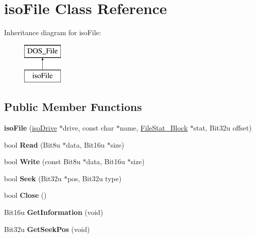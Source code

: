 \hypertarget{classisoFile}{\section{iso\-File Class Reference}
\label{classisoFile}
}
Inheritance diagram for iso\-File\-:\begin{figure}[H]
\begin{center}
\leavevmode
\includegraphics[height=2.000000cm]{classisoFile}
\end{center}
\end{figure}
\subsection*{Public Member Functions}
\begin{DoxyCompactItemize}
\item 
\hypertarget{classisoFile_a67bf2750ca70939ed41e6ecb53c5f355}{{\bfseries iso\-File} (\hyperlink{classisoDrive}{iso\-Drive} $\ast$drive, const char $\ast$name, \hyperlink{structFileStat__Block}{File\-Stat\-\_\-\-Block} $\ast$stat, Bit32u offset)}\label{classisoFile_a67bf2750ca70939ed41e6ecb53c5f355}

\item 
\hypertarget{classisoFile_ab0640960de5d525449c71bb2258622ee}{bool {\bfseries Read} (Bit8u $\ast$data, Bit16u $\ast$size)}\label{classisoFile_ab0640960de5d525449c71bb2258622ee}

\item 
\hypertarget{classisoFile_a3d8a957425779149fa43b2e494380ec6}{bool {\bfseries Write} (const Bit8u $\ast$data, Bit16u $\ast$size)}\label{classisoFile_a3d8a957425779149fa43b2e494380ec6}

\item 
\hypertarget{classisoFile_a0540cf01d0e167584638b5ee5c116cd3}{bool {\bfseries Seek} (Bit32u $\ast$pos, Bit32u type)}\label{classisoFile_a0540cf01d0e167584638b5ee5c116cd3}

\item 
\hypertarget{classisoFile_a06749457b292297b7830776d113ad886}{bool {\bfseries Close} ()}\label{classisoFile_a06749457b292297b7830776d113ad886}

\item 
\hypertarget{classisoFile_a6e3255593ac75149fac3ab29ddc2a32d}{Bit16u {\bfseries Get\-Information} (void)}\label{classisoFile_a6e3255593ac75149fac3ab29ddc2a32d}

\item 
\hypertarget{classisoFile_a7b78a353cbde35194b15f869d547a763}{Bit32u {\bfseries Get\-Seek\-Pos} (void)}\label{classisoFile_a7b78a353cbde35194b15f869d547a763}

\end{DoxyCompactItemize}


